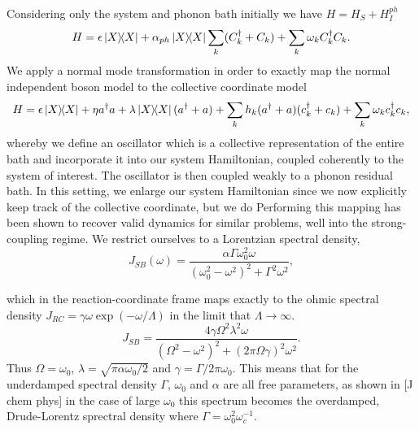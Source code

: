 \documentclass[]{article}
\begin{document}
 Considering only the system and phonon bath initially we have $H = H_S + H_I^{ph}$
\begin{equation}
H = \epsilon \dyad{X} + \alpha_{ph}\dyad{X}\sum_{k}(C^{\dagger}_k+C_k) + \sum_{k}\omega_k C^{\dagger}_k C_k.
\end{equation}
We apply a normal mode transformation in order to exactly map the normal independent boson model to the collective coordinate model
\begin{equation}
H = \epsilon \dyad{X} + \eta a^{\dagger}a + \lambda\dyad{X}(a^{\dagger}+a) + \sum_{k}h_k(a^{\dagger}+a)(c^{\dagger}_k+c_k) + \sum_{k}\omega_k c^{\dagger}_k c_k,
\end{equation}
whereby we define an oscillator which  is a collective representation of the entire bath and incorporate it into our system Hamiltonian, coupled coherently to the system of interest. The oscillator is then coupled weakly to a phonon residual bath. In this setting, we enlarge our system Hamiltonian since we now explicitly keep track of the collective coordinate, but we do Performing this mapping has been shown to recover valid dynamics for similar problems, well into the strong-coupling regime.
We restrict ourselves to a Lorentzian spectral density, 
\begin{equation}
\label{eq:DrudeLorentzUnderdamped}
J_{SB}(\omega) = \frac{\alpha \Gamma \omega_0^2\omega}{(\omega_0^2-\omega^2)^2 + \Gamma^2\omega^2},
\end{equation}

which in the reaction-coordinate frame maps exactly to the ohmic spectral density $J_{RC} = \gamma \omega \exp(-\omega/\Lambda)$ in the limit that $\Lambda\to\infty$.
\begin{equation}
\label{eq:DrudeLorentzUnderdamped1}
J_{SB}  = \frac{4\gamma\Omega^2\lambda^2\omega}{(\Omega^2-\omega^2)^2 + (2\pi\Omega\gamma)^2\omega^2}.
\end{equation}
Thus $\Omega = \omega_0$, $\lambda=\sqrt{\pi \alpha \omega_0/2}$ and $\gamma=\Gamma/2\pi\omega_0$. This means that for the underdamped spectral density $\Gamma$, $\omega_0$ and $\alpha$ are all free parameters, as shown in [J chem phys] in the case of large $\omega_0$ this spectrum becomes the overdamped, Drude-Lorentz sprectral density where $\Gamma=\omega_0^2\omega_c^{-1}$.
\end{document}
